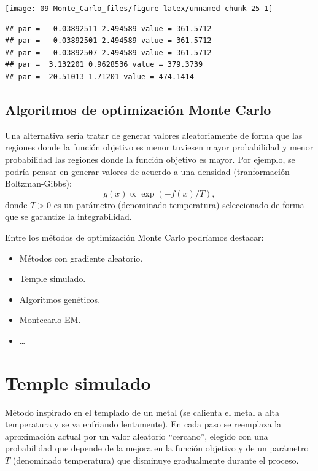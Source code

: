\documentclass[]{book}
\theoremstyle{definition}
\theoremstyle{definition}
\theoremstyle{definition}
\theoremstyle{remark}
\begin{document}
\begin{center}\texttt{[image: 09-Monte\_Carlo\_files/figure-latex/unnamed-chunk-25-1]} \end{center}

\begin{verbatim}
## par =  -0.03892511 2.494589 value = 361.5712 
## par =  -0.03892501 2.494589 value = 361.5712 
## par =  -0.03892507 2.494589 value = 361.5712 
## par =  3.132201 0.9628536 value = 379.3739 
## par =  20.51013 1.71201 value = 474.1414
\end{verbatim}

\subsection{Algoritmos de optimización Monte
Carlo}\label{algoritmos-de-optimizacion-monte-carlo}

Una alternativa sería tratar de generar valores aleatoriamente de forma
que las regiones donde la función objetivo es menor tuviesen mayor
probabilidad y menor probabilidad las regiones donde la función objetivo
es mayor. Por ejemplo, se podría pensar en generar valores de acuerdo a
una densidad (tranformación Boltzman-Gibbs):
\[g(x)\propto \exp \left( -f(x)/T\right) ,\]donde \(T>0\) es un
parámetro (denominado temperatura) seleccionado de forma que se
garantize la integrabilidad.

Entre los métodos de optimización Monte Carlo podríamos destacar:

\begin{itemize}
\item
  Métodos con gradiente aleatorio.
\item
  Temple simulado.
\item
  Algoritmos genéticos.
\item
  Montecarlo EM.
\item
  \ldots{}
\end{itemize}

\section{Temple simulado}\label{temple-simulado}

Método inspirado en el templado de un metal (se calienta el metal a alta
temperatura y se va enfriando lentamente). En cada paso se reemplaza la
aproximación actual por un valor aleatorio ``cercano'', elegido con una
probabilidad que depende de la mejora en la función objetivo y de un
parámetro \(T\) (denominado temperatura) que disminuye gradualmente
durante el proceso.
\end{document}
